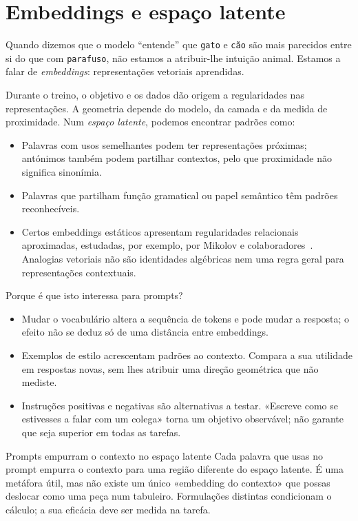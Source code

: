 \section{Embeddings e espaço latente}

Quando dizemos que o modelo “entende” que \texttt{gato} e \texttt{cão} são mais parecidos entre si do que com \texttt{parafuso}, não estamos a atribuir-lhe intuição animal. Estamos a falar de \emph{embeddings}: representações vetoriais aprendidas.

Durante o treino, o objetivo e os dados dão origem a regularidades nas representações. A geometria depende do modelo, da camada e da medida de proximidade. Num \emph{espaço latente}, podemos encontrar padrões como:

\begin{itemize}[leftmargin=*]
\item Palavras com usos semelhantes podem ter representações próximas; antónimos também podem partilhar contextos, pelo que proximidade não significa sinonímia.
\item Palavras que partilham função gramatical ou papel semântico têm padrões reconhecíveis.
\item Certos embeddings estáticos apresentam regularidades relacionais aproximadas, estudadas, por exemplo, por Mikolov e colaboradores~\citep{mikolov2013}. Analogias vetoriais não são identidades algébricas nem uma regra geral para representações contextuais.
\end{itemize}

Porque é que isto interessa para prompts?

\begin{itemize}[leftmargin=*]
\item Mudar o vocabulário altera a sequência de tokens e pode mudar a resposta; o efeito não se deduz só de uma distância entre embeddings.
\item Exemplos de estilo acrescentam padrões ao contexto. Compara a sua utilidade em respostas novas, sem lhes atribuir uma direção geométrica que não mediste.
\item Instruções positivas e negativas são alternativas a testar. «Escreve como se estivesses a falar com um colega» torna um objetivo observável; não garante que seja superior em todas as tarefas.
\end{itemize}

\begin{keyideabox}{Prompts empurram o contexto no espaço latente}
Cada palavra que usas no prompt empurra o contexto para uma região diferente do espaço latente. É uma metáfora útil, mas não existe um único «embedding do contexto» que possas deslocar como uma peça num tabuleiro. Formulações distintas condicionam o cálculo; a sua eficácia deve ser medida na tarefa.
\end{keyideabox}

